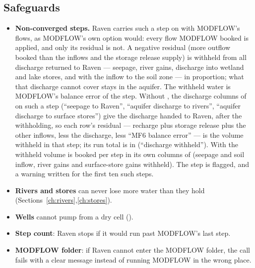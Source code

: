 \subsection{Safeguards}\label{sec:guard}
\begin{itemize}
\item \textbf{Non-converged steps.} Raven carries such a step on with MODFLOW's flows, as MODFLOW's own
 option would: every flow MODFLOW booked is applied, and only its residual is not. A negative residual
(more outflow booked than the inflows and the storage release supply) is withheld from all discharge returned to Raven
--- seepage, river gains, discharge into wetland and lake stores, and with  the inflow to the
soil zone --- in proportion; what that discharge cannot cover stays in the aquifer. The withheld water is MODFLOW's
balance error of the step. Without , the discharge columns of  on such a step
(``seepage to Raven'', ``aquifer discharge to rivers'', ``aquifer discharge to surface stores'') give the discharge
handed to Raven, after the withholding, so each row's residual --- recharge plus storage release plus the other inflows,
less the discharge, less ``MF6 balance error'' --- is the volume withheld in that step; its run total is in
 (``discharge withheld''). With  the withheld volume is booked per step
in its own columns of  (seepage and soil inflow, river gains and surface-store gains withheld). The step is
flagged, and a warning written for the first ten such steps.
\item \textbf{Rivers and stores} can never lose more water than they hold (Sections~\ref{ch:rivers},\ref{ch:stores}).
\item \textbf{Wells} cannot pump from a dry cell ().
\item \textbf{Step count}: Raven stops if it would run past MODFLOW's last step.
\item \textbf{MODFLOW folder}: if Raven cannot enter the MODFLOW folder, the call fails with a clear message instead of
running MODFLOW in the wrong place.
\end{itemize}


